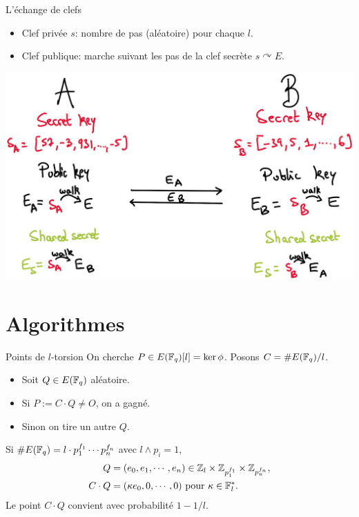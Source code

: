 \documentclass{beamer}
\begin{document}
\begin{frame}{L'\'echange de clefs}
	\begin{itemize}
		\item Clef priv\'ee $s$: nombre de pas (al\'eatoire) pour chaque $l$.
		\item Clef publique: marche suivant les pas de la clef secr\`ete $s\curvearrowright E$.
	\end{itemize}
\begin{center}
	\includegraphics[scale=0.2]{../figs/DH}
\end{center}
\end{frame}

\section{Algorithmes}
\begin{frame}{Points de $l$-torsion}
	On cherche $P\in E(\mathbb{F}_q)[l] = \ker\phi$. Posons $C = \#E(\mathbb{F}_q) / l$.
	\begin{itemize}
		\item Soit $Q\in E(\mathbb{F}_q)$ al\'eatoire.
		\item Si $P := C\cdot Q \neq O$, on a gagn\'e.
		\item Sinon on tire un autre $Q$.
	\end{itemize}
	Si $\#E(\mathbb{F}_q) = l \cdot p_1 ^{f_1}\cdots p_n^{f_n}$ avec $l\wedge p_i = 1$,
	\begin{align*}
		Q &= (e_0, e_1, \cdots, e_n)\in \mathbb{Z}_{l}\times \mathbb{Z}_{p_1^{f_1}}\times \mathbb{Z}_{p_n^{f_n}},\\
		C\cdot Q &= (\kappa e_0, 0, \cdots, 0) \text{ pour } \kappa\in \mathbb{F}_l^{*}.
	\end{align*}
	Le point $C\cdot Q$ convient avec probabilit\'e $1-1/l$.
\end{frame}
\end{document}
